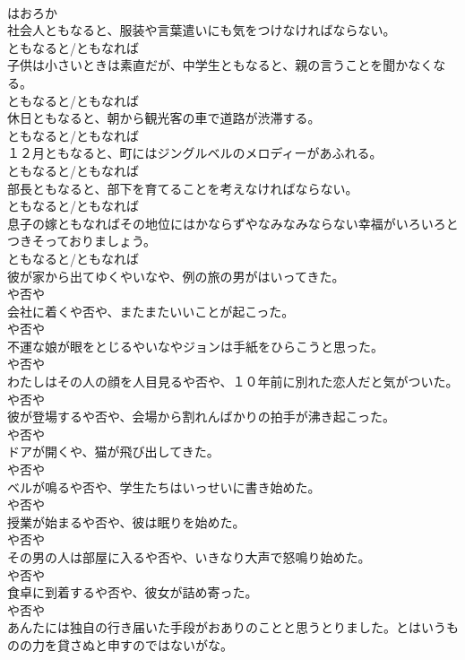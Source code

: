 \documentclass[8pt]{extreport}
\begin{document}
\begin{CJK}{UTF8}{min}
\\	はおろか
\\	社会人ともなると、服装や言葉遣いにも気をつけなければならない。	
\\	ともなると/ともなれば
\\	子供は小さいときは素直だが、中学生ともなると、親の言うことを聞かなくなる。	
\\	ともなると/ともなれば
\\	休日ともなると、朝から観光客の車で道路が渋滞する。	
\\	ともなると/ともなれば
\\	１２月ともなると、町にはジングルベルのメロディーがあふれる。	
\\	ともなると/ともなれば
\\	部長ともなると、部下を育てることを考えなければならない。	
\\	ともなると/ともなれば
\\	息子の嫁ともなればその地位にはかならずやなみなみならない幸福がいろいろとつきそっておりましょう。	
\\	ともなると/ともなれば
\\	彼が家から出てゆくやいなや、例の旅の男がはいってきた。	
\\	や否や
\\	会社に着くや否や、またまたいいことが起こった。	
\\	や否や
\\	不運な娘が眼をとじるやいなやジョンは手紙をひらこうと思った。	
\\	や否や
\\	わたしはその人の顔を人目見るや否や、１０年前に別れた恋人だと気がついた。	
\\	や否や
\\	彼が登場するや否や、会場から割れんばかりの拍手が沸き起こった。	
\\	や否や
\\	ドアが開くや、猫が飛び出してきた。	
\\	や否や
\\	ベルが鳴るや否や、学生たちはいっせいに書き始めた。	
\\	や否や
\\	授業が始まるや否や、彼は眠りを始めた。	
\\	や否や
\\	その男の人は部屋に入るや否や、いきなり大声で怒鳴り始めた。	
\\	や否や
\\	食卓に到着するや否や、彼女が詰め寄った。	
\\	や否や
\\	あんたには独自の行き届いた手段がおありのことと思うとりました。とはいうものの力を貸さぬと申すのではないがな。	

\end{CJK}
\end{document}
